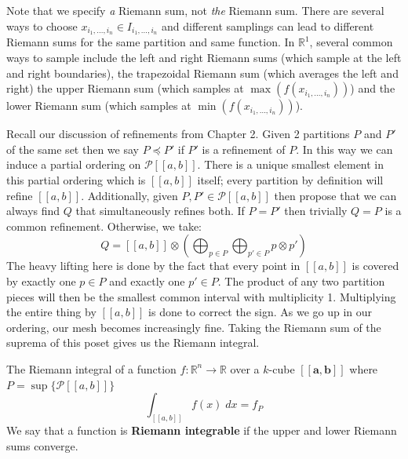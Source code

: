 Note that we specify \emph{a} Riemann sum, not \emph{the} Riemann sum.
There are several ways to choose $x_{i_1,\ldots,i_n} \in I_{i_1, \ldots, i_n}$ and different samplings can lead to different Riemann sums for the same partition and same function.
In $\mathbb{R}^1$, several common ways to sample include the left and right Riemann sums (which sample at the left and right boundaries), the trapezoidal Riemann sum (which averages the left and right) the upper Riemann sum (which samples at $\max(f(x_{i_1, \ldots, i_n}))$) and the lower Riemann sum (which samples at $\min(f(x_{i_1,\ldots,i_n}))$).

Recall our discussion of refinements from Chapter 2.
Given 2 partitions $P$ and $P'$ of the same set then we say $P \preceq P'$ if $P'$ is a refinement of $P$.
In this way we can induce a partial ordering on $\mathcal{P}[\![a,b]\!]$.
There is a unique smallest element in this partial ordering which is $[\![a,b]\!]$ itself; 
every partition by definition will refine $[\![a,b]\!]$.
Additionally, given $P,P' \in \mathcal{P}[\![a,b]\!]$ then propose that we can always find $Q$ that simultaneously refines both.
If $P=P'$ then trivially $Q=P$ is a common refinement.
Otherwise, we take:
\begin{equation}
	Q= [\![a,b]\!] \otimes \left( \bigoplus_{p\in P} \bigoplus_{p' \in P} p \otimes p' \right)
\end{equation}
The heavy lifting here is done by the fact that every point in $[\![a,b]\!]$ is covered by exactly one $p\in P$ and exactly one $p' \in P$.
The product of any two partition pieces will then be the smallest common interval with multiplicity 1.
Multiplying the entire thing by $[\![a,b]\!]$ is done to correct the sign.
As we go up in our ordering, our mesh becomes increasingly fine.
Taking the Riemann sum of the suprema of this poset gives us the Riemann integral.

\begin{definition}
The Riemann integral of a function $f:\mathbb{R}^n \to \mathbb{R}$ over a $k$-cube $[\![\boldsymbol{a}, \boldsymbol{b}]\!]$
where $P = \sup \Big\{ \mathcal{P} [\![a,b]\!] \Big\}$
	\begin{equation}
		\int_{[\![a,b]\!]} f(x) \; dx = f_P
	\end{equation} 
	We say that a function is \textbf{Riemann integrable} if the upper and lower Riemann sums converge.
\end{definition}



